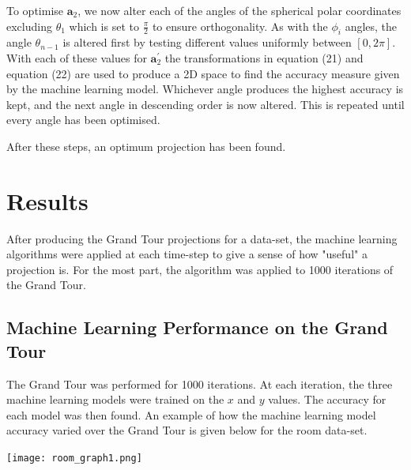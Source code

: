\documentclass[a4paper,11pt,twoside]{article}
\begin{document}
To optimise $\bm{a}_2$, we now alter each of the angles of the spherical polar coordinates excluding $\theta_1$ which is set to $\frac{\pi}{2}$ to ensure orthogonality. As with the $\phi_i$ angles, the angle $\theta_{n-1}$ is altered first by testing different values uniformly between $[0, 2\pi]$. With each of these values for $\bm{a}_2^{\prime}$ the transformations in equation (21) and equation (22) are used to produce a 2D space to find the accuracy measure given by the machine learning model. Whichever angle produces the highest accuracy is kept, and the next angle in descending order is now altered. This is repeated until every angle has been optimised.
\newline

After these steps, an optimum projection has been found.
\newpage
\section{Results}

After producing the Grand Tour projections for a data-set, the machine learning algorithms were applied at each time-step to give a sense of how "useful" a projection is. For the most part, the algorithm was applied to 1000 iterations of the Grand Tour.
\subsection{Machine Learning Performance on the Grand Tour}

The Grand Tour was performed for 1000 iterations. At each iteration, the three machine learning models were trained on the $x$ and $y$ values. The accuracy for each model was then found. An example of how the machine learning model accuracy varied over the Grand Tour is given below for the room data-set.
\begin{center}
\texttt{[image: room\_graph1.png]}

\end{center}
\end{document}
